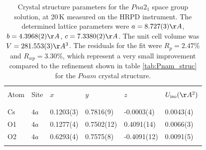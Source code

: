 \documentclass[prb,aps,twocolumn,superscriptaddress,showpacs,footinbib]{revtex4-2}
\begin{document}
\begin{table}
\caption{Crystal structure parameters for the $Pna2_{1}$ space group solution, at 20\,K measured on the HRPD instrument. The determined lattice parameters were $a = 8.727(3) \AA$, $b = 4.3968(2) \AA$, $c = 7.3380(2) \AA$. The unit cell volume was $V = 281.553(3) \AA^{3}$. The residuals for the fit were $R_{p}=2.47\%$ and $R_{wp}=3.30\%$, which represent a very small improvement compared to the refinement shown in table \ref{tab:Pnam_struc} for the $Pnam$ crystal structure.}
\centering
\begin{tabular}{ p{9mm}p{8mm}p{15mm}p{15mm}p{16mm}p{15mm}  }
 \hline \hline
 \vspace{1mm} & \vspace{1mm} & \vspace{1mm} & \vspace{1mm} & \vspace{1mm} & \vspace{1mm} \\
 Atom & Site & $x$ & $y$ & $z$ & $U_{\rm{iso}} (\AA^{2})$\\
 \vspace{1mm} & \vspace{1mm} & \vspace{1mm} & \vspace{1mm} & \vspace{1mm} & \vspace{1mm} \\
 \hline
 \vspace{1mm} & \vspace{1mm} & \vspace{1mm} & \vspace{1mm} & \vspace{1mm} & \vspace{1mm} \\
 Cs & $4a$ & 0.1203(3) & 0.7816(9) & -0.0003(4) & 0.0043(4)\\
 O1 & $4a$ & 0.1277(4) & 0.7502(12) & 0.4091(14) & 0.0066(3)\\
 O2 & $4a$ & 0.6293(4) & 0.7575(8) & -0.4091(12) & 0.0091(5)\\
 \vspace{1mm} & \vspace{1mm} & \vspace{1mm} & \vspace{1mm} & \vspace{1mm} & \vspace{1mm} \\
 \hline
\end{tabular}
\label{tab:Pna21_struc}
\end{table}
\end{document}
